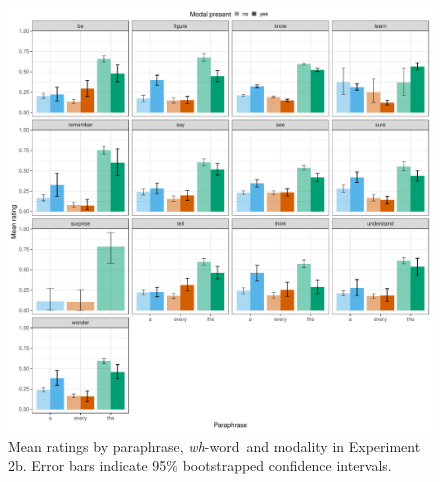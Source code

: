 \documentclass[12pt,letterpaper,table,svgnames,dvipsnames]{article}
\newcommand{\whw}{\emph{wh}-word~}
\begin{document}
\begin{figure}[h!]
\centering
\includegraphics[scale=.6]{figures/matrixverbs_threotical_nocontext.pdf}
\caption{Mean ratings by paraphrase, \whw and modality in Experiment 2b. Error bars indicate 95\% bootstrapped confidence intervals.} 
\label{ex2b_matrix_verbs}
\end{figure}
\end{document}
